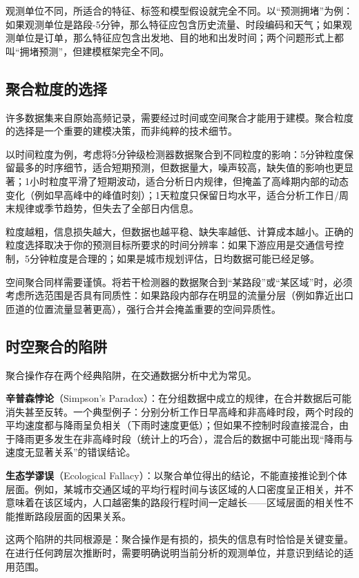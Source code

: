 观测单位不同，所适合的特征、标签和模型假设就完全不同。以“预测拥堵”为例：如果观测单位是路段-5分钟，那么特征应包含历史流量、时段编码和天气；如果观测单位是订单，那么特征应包含出发地、目的地和出发时间；两个问题形式上都叫“拥堵预测”，但建模框架完全不同。

\subsection{聚合粒度的选择}

许多数据集来自原始高频记录，需要经过时间或空间聚合才能用于建模。聚合粒度的选择是一个重要的建模决策，而非纯粹的技术细节。

以时间粒度为例，考虑将5分钟级检测器数据聚合到不同粒度的影响：5分钟粒度保留最多的时序细节，适合短期预测，但数据量大，噪声较高，缺失值的影响也更显著；1小时粒度平滑了短期波动，适合分析日内规律，但掩盖了高峰期内部的动态变化（例如早高峰中的峰值时刻）；1天粒度只保留日均水平，适合分析工作日/周末规律或季节趋势，但失去了全部日内信息。

粒度越粗，信息损失越大，但数据也越平稳、缺失率越低、计算成本越小。正确的粒度选择取决于你的预测目标所要求的时间分辨率：如果下游应用是交通信号控制，5分钟粒度是合理的；如果是城市规划评估，日均数据可能已经足够。

空间聚合同样需要谨慎。将若干检测器的数据聚合到“某路段”或“某区域”时，必须考虑所选范围是否具有同质性：如果路段内部存在明显的流量分层（例如靠近出口匝道的位置流量显著更高），强行合并会掩盖重要的空间异质性。

\subsection{时空聚合的陷阱}

聚合操作存在两个经典陷阱，在交通数据分析中尤为常见。

\textbf{辛普森悖论}（Simpson's Paradox）：在分组数据中成立的规律，在合并数据后可能消失甚至反转。一个典型例子：分别分析工作日早高峰和非高峰时段，两个时段的平均速度都与降雨呈负相关（下雨时速度更低）；但如果不控制时段直接混合，由于降雨更多发生在非高峰时段（统计上的巧合），混合后的数据中可能出现“降雨与速度无显著关系”的错误结论。

\textbf{生态学谬误}（Ecological Fallacy）：以聚合单位得出的结论，不能直接推论到个体层面。例如，某城市交通区域的平均行程时间与该区域的人口密度呈正相关，并不意味着在该区域内，人口越密集的路段行程时间一定越长——区域层面的相关性不能推断路段层面的因果关系。

这两个陷阱的共同根源是：聚合操作是有损的，损失的信息有时恰恰是关键变量。在进行任何跨层次推断时，需要明确说明当前分析的观测单位，并意识到结论的适用范围。


